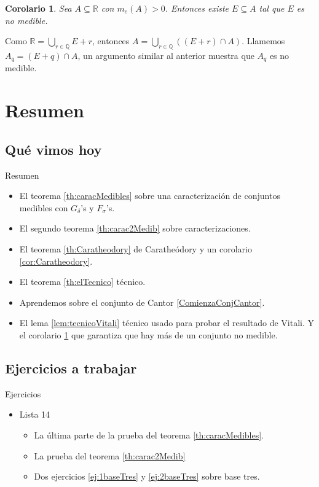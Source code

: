 \documentclass[utf8]{beamer}
\theoremstyle{plain}
\newtheorem{Cor}{Corolario}            %
\theoremstyle{definition}
\theoremstyle{remark}
\numberwithin{equation}{section}
\newcommand{\dl}{\delta}                %
\newcommand{\sg}{\sigma}                %
\newcommand{\bQ}{\mathbb{Q}}    %
\newcommand{\bR}{\mathbb{R}}    %
\renewcommand{\.}{\Cdot}                %
\begin{document}
\begin{frame}
  \begin{Cor}\label{cor:DeVitali}
    Sea $A\subseteq\bR$ con $m_e(A)>0$. Entonces existe $E\subseteq A$ tal que $E$ es no medible.
  \end{Cor}
  Como $\bR=\bigcup_{r\in\bQ}E+r$, entonces $A=\bigcup_{r\in\bQ}((E+r)\cap A)$. Llamemos $A_q=(E+q)\cap A$, un argumento similar al anterior muestra que $A_q$ es no medible.
\end{frame}
\section*{Resumen}

\subsection*{Qu\'e vimos hoy}

\begin{frame}{Resumen}

  \begin{itemize}
  \item El teorema \ref{th:caracMedibles} sobre una caracterización de conjuntos medibles con $G_\dl$'s y $F_\sg$'s. 
  \item El segundo teorema \ref{th:carac2Medib} sobre caracterizaciones.
  \item El teorema \ref{th:Caratheodory} de Carathe\'odory y un corolario \ref{cor:Caratheodory}.
  \item El teorema \ref{th:elTecnico} t\'ecnico.
  \item Aprendemos sobre el conjunto de Cantor \ref{ComienzaConjCantor}.
  \item El lema \ref{lem:tecnicoVitali} t\'ecnico usado para probar el resultado de Vitali. Y el corolario \ref{cor:DeVitali} que garantiza que hay m\'as de un conjunto no medible.
  \end{itemize}
  
\end{frame}

\subsection*{Ejercicios a trabajar}
\begin{frame}{Ejercicios}
    
  \begin{itemize}
    \item
      Lista 14
      \begin{itemize}
      \item La última parte de la prueba del teorema \ref{th:caracMedibles}.
      \item La prueba del teorema \ref{th:carac2Medib}
      \item Dos ejercicios \ref{ej:1baseTres} y \ref{ej:2baseTres} sobre base tres.
      \end{itemize}
    \end{itemize}
  
\end{frame}
\end{document}
